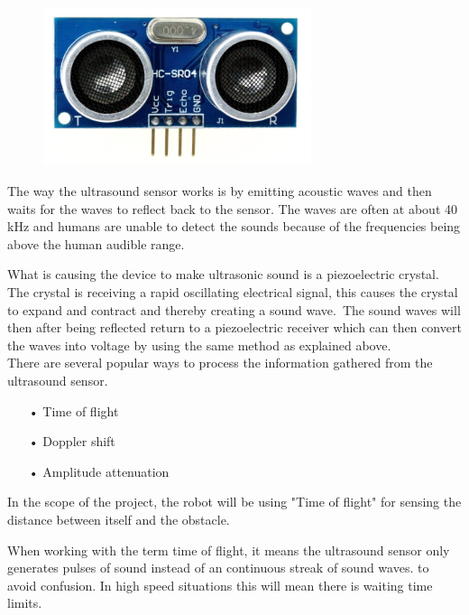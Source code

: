 \begin{figure}[!ht]
	\centering
	\includegraphics[width=0.7\textwidth]{figures/hc04.jpg}
	\caption{}
	\label{Hardware diagram}
\end{figure}

 
The way the ultrasound sensor works is by emitting acoustic waves and then waits for the waves to reflect back to the sensor. The waves are often at about 40 kHz and humans are unable to detect the sounds because of the frequencies being above the human audible range.\

What is causing the device to make ultrasonic sound is a piezoelectric crystal. The crystal is receiving a rapid oscillating electrical signal, this causes the crystal to expand and contract and thereby creating a sound wave.\ The sound waves will then after being reflected return to a piezoelectric receiver which can then convert the waves into voltage by using the same method as explained above. \\


There are several popular ways to process the information gathered from the ultrasound sensor. \\

\begin{enumerate}
	\item[•]Time of flight
	\item[•]Doppler shift
	\item[•]Amplitude attenuation
\end{enumerate}

In the scope of the project, the robot will be using "Time of flight" for sensing the distance between itself and the obstacle.\

When working with the term time of flight, it means the ultrasound sensor only generates pulses of sound instead of an continuous streak of sound waves. to avoid confusion. In high speed situations this will mean there is waiting time limits.\\ 

